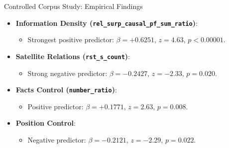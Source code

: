 \documentclass[aspectratio=169]{beamer}
\begin{document}
\begin{frame}{Controlled Corpus Study: Empirical Findings}
    \begin{itemize}
        \item \textbf{Information Density (\texttt{rel\_surp\_causal\_pf\_sum\_ratio})}:
            \begin{itemize}
                \item Strongest positive predictor: $\beta = +0.6251$, $z = 4.63$, $p < 0.00001$.
            \end{itemize}
        \vspace{0.1cm}
        \item \textbf{Satellite Relations (\texttt{rst\_s\_count})}:
            \begin{itemize}
                \item Strong negative predictor: $\beta = -0.2427$, $z = -2.33$, $p = 0.020$.
            \end{itemize}
        \vspace{0.1cm}
        \item \textbf{Facts Control (\texttt{number\_ratio})}:
            \begin{itemize}
                \item Positive predictor: $\beta = +0.1771$, $z = 2.63$, $p = 0.008$.
            \end{itemize}
        \vspace{0.1cm}
        \item \textbf{Position Control}:
            \begin{itemize}
                \item Negative predictor: $\beta = -0.2121$, $z = -2.29$, $p = 0.022$.
            \end{itemize}
    \end{itemize}
\end{frame}
\end{document}

